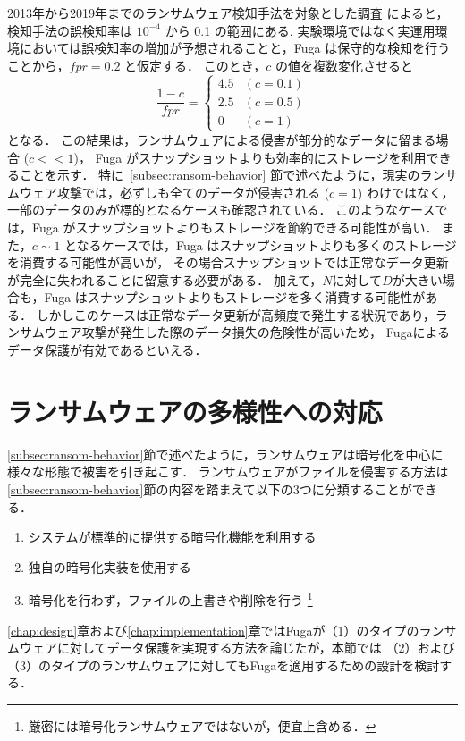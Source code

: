 2013年から2019年までのランサムウェア検知手法を対象とした調査\cite{berrueta2019survey} によると，
検知手法の誤検知率は \(10^{-4}\) から 0.1 の範囲にある.
実験環境ではなく実運用環境においては誤検知率の増加が予想されることと，Fuga は保守的な検知を行うことから，\(fpr = 0.2\) と仮定する．
このとき，\(c\) の値を複数変化させると
\begin{equation}
  \frac{1-c}{fpr} =
  \begin{cases}
    4.5 & (c = 0.1) \\
    2.5 & (c = 0.5) \\
    0   & (c = 1)
  \end{cases}
\end{equation}
となる．
この結果は，ランサムウェアによる侵害が部分的なデータに留まる場合 (\(c << 1\))，
Fuga がスナップショットよりも効率的にストレージを利用できることを示す．
特に~\ref{subsec:ransom-behavior} 節で述べたように，現実のランサムウェア攻撃では，必ずしも全てのデータが侵害される (\(c = 1\)) わけではなく，
一部のデータのみが標的となるケースも確認されている．
このようなケースでは，Fuga がスナップショットよりもストレージを節約できる可能性が高い．
また，\(c \sim 1\) となるケースでは，Fuga はスナップショットよりも多くのストレージを消費する可能性が高いが，
その場合スナップショットでは正常なデータ更新が完全に失われることに留意する必要がある．
加えて，$N$に対して$D$が大きい場合も，Fuga はスナップショットよりもストレージを多く消費する可能性がある．
しかしこのケースは正常なデータ更新が高頻度で発生する状況であり，ランサムウェア攻撃が発生した際のデータ損失の危険性が高いため，
Fugaによるデータ保護が有効であるといえる．





\section{ランサムウェアの多様性への対応}
\ref{subsec:ransom-behavior}節で述べたように，ランサムウェアは暗号化を中心に様々な形態で被害を引き起こす．
ランサムウェアがファイルを侵害する方法は\ref{subsec:ransom-behavior}節の内容を踏まえて以下の3つに分類することができる．
\begin{enumerate}
  \item システムが標準的に提供する暗号化機能を利用する
  \item 独自の暗号化実装を使用する
  \item 暗号化を行わず，ファイルの上書きや削除を行う \footnote{厳密には暗号化ランサムウェアではないが，便宜上含める．}
\end{enumerate}
\ref{chap:design}章および\ref{chap:implementation}章ではFugaが（1）のタイプのランサムウェアに対してデータ保護を実現する方法を論じたが，本節では
（2）および（3）のタイプのランサムウェアに対してもFugaを適用するための設計を検討する．

